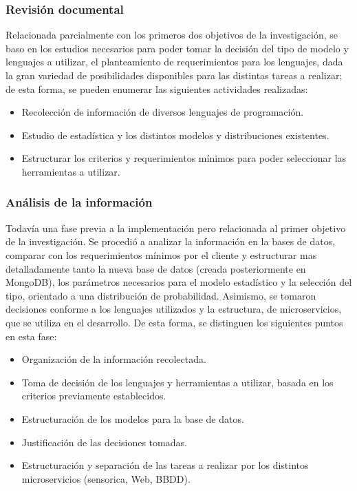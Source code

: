 \subsubsection{Revisión documental}
Relacionada parcialmente con los primeros dos objetivos de la investigación,
se baso en los estudios necesarios para poder tomar la decisión del tipo de modelo
y lenguajes a utilizar, el planteamiento de requerimientos para los
lenguajes, dada la gran variedad de posibilidades disponibles para las distintas
tareas a realizar; de esta forma, se pueden enumerar las siguientes actividades
realizadas:

\begin{itemize}
    \item Recolección de información de diversos lenguajes de programación.
    \item Estudio de estadística y los distintos modelos y distribuciones existentes.
    \item Estructurar los criterios y requerimientos mínimos para poder seleccionar
        las herramientas a utilizar.
\end{itemize}

\subsubsection{Análisis de la información}
Todavía una fase previa a la implementación pero relacionada al primer objetivo
de la investigación. Se procedió a analizar la información en la bases de datos,
comparar con los requerimientos mínimos por el cliente y estructurar mas detalladamente
tanto la nueva base de datos (creada posteriormente en MongoDB), los parámetros
necesarios para el modelo estadístico y la selección del tipo, orientado a una
distribución de probabilidad. Asimismo, se tomaron decisiones conforme a los
lenguajes utilizados y la estructura, de microservicios, que se utiliza en el
desarrollo. De esta forma, se distinguen los siguientes puntos en esta fase:

\begin{itemize}
    \item Organización de la información recolectada.
    \item Toma de decisión de los lenguajes y herramientas a utilizar, basada
        en los criterios previamente establecidos.
    \item Estructuración de los modelos para la base de datos.
    \item Justificación de las decisiones tomadas.
    \item Estructuración y separación de las tareas a realizar por los distintos
        microservicios (sensorica, Web, BBDD).
\end{itemize}

